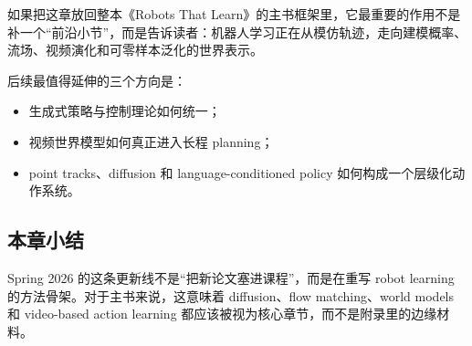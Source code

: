 \documentclass[a4paper]{article}
\begin{document}
如果把这章放回整本《Robots That Learn》的主书框架里，它最重要的作用不是补一个“前沿小节”，而是告诉读者：机器人学习正在从模仿轨迹，走向建模概率、流场、视频演化和可零样本泛化的世界表示。

后续最值得延伸的三个方向是：
\begin{itemize}
  \item 生成式策略与控制理论如何统一；
  \item 视频世界模型如何真正进入长程 planning；
  \item point tracks、diffusion 和 language-conditioned policy 如何构成一个层级化动作系统。
\end{itemize}

\subsection{本章小结}

Spring 2026 的这条更新线不是“把新论文塞进课程”，而是在重写 robot learning 的方法骨架。对于主书来说，这意味着 diffusion、flow matching、world models 和 video-based action learning 都应该被视为核心章节，而不是附录里的边缘材料。
\end{document}
